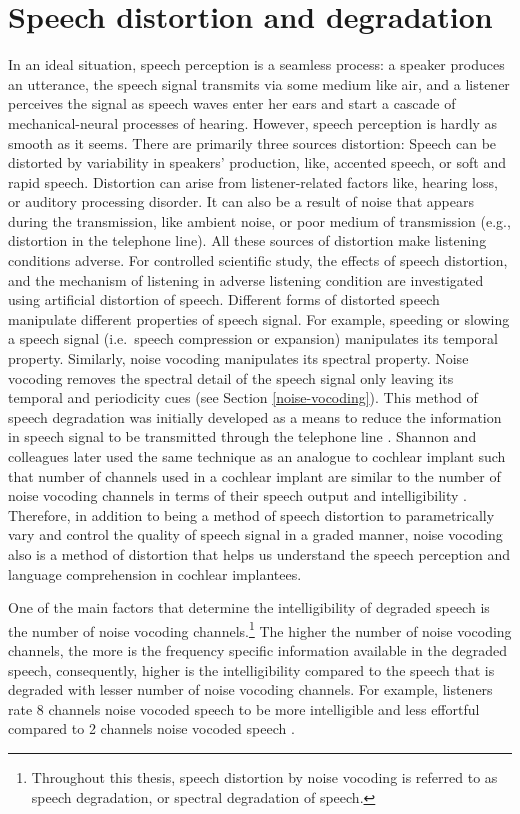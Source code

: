 \documentclass[a4paper, nobind]{templates/ociamthesis}
\begin{document}
\hypertarget{speech-distortion-and-degradation}{%
\section{Speech distortion and degradation}\label{speech-distortion-and-degradation}}

In an ideal situation, speech perception is a seamless process: a speaker produces an utterance, the speech signal transmits via some medium like air, and a listener perceives the signal as speech waves enter her ears and start a cascade of mechanical-neural processes of hearing.
However, speech perception is hardly as smooth as it seems.
There are primarily three sources distortion:
Speech can be distorted by variability in speakers' production, like, accented speech, or soft and rapid speech.
Distortion can arise from listener-related factors like, hearing loss, or auditory processing disorder.
It can also be a result of noise that appears during the transmission, like ambient noise, or poor medium of transmission (e.g., distortion in the telephone line).
All these sources of distortion make listening conditions adverse.
For controlled scientific study, the effects of speech distortion, and the mechanism of listening in adverse listening condition are investigated using artificial distortion of speech.
Different forms of distorted speech manipulate different properties of speech signal.
For example, speeding or slowing a speech signal (i.e.~speech compression or expansion) manipulates its temporal property.
Similarly, noise vocoding manipulates its spectral property.
Noise vocoding removes the spectral detail of the speech signal only leaving its temporal and periodicity cues (see Section \ref{noise-vocoding}).
This method of speech degradation was initially developed as a means to reduce the information in speech signal to be transmitted through the telephone line \autocite{Dudley1939,Vocoder1940}.
Shannon and colleagues later used the same technique as an analogue to cochlear implant such that number of channels used in a cochlear implant are similar to the number of noise vocoding channels in terms of their speech output and intelligibility \autocite{Shannon1995,Loizou1999,Shannon2004}.
Therefore, in addition to being a method of speech distortion to parametrically vary and control the quality of speech signal in a graded manner, noise vocoding also is a method of distortion that helps us understand the speech perception and language comprehension in cochlear implantees.

One of the main factors that determine the intelligibility of degraded speech is the number of noise vocoding channels.\footnote{Throughout this thesis, speech distortion by noise vocoding is referred to as speech degradation, or spectral degradation of speech.}
The higher the number of noise vocoding channels, the more is the frequency specific information available in the degraded speech,
consequently, higher is the intelligibility compared to the speech that is degraded with lesser number of noise vocoding channels.
For example, listeners rate 8 channels noise vocoded speech to be more intelligible and less effortful compared to 2 channels noise vocoded speech \autocite[e.g.,][]{Sohoglu2012}.
\end{document}
